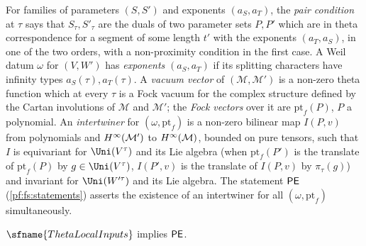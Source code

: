 \begin{definition}\label{pf:fs:pairdefs}
For families of parameters $(S,S')$ and exponents $(a_S,a_T)$, the \emph{pair condition} at $\tau$ says that $S_\tau,S'_\tau$ are the
duals of two parameter sets $P,P'$ which are in theta correspondence for a segment of some length $t'$ with the exponents
$(a_T,a_S)$, in one of the two orders, with a non-proximity condition in the first case. A Weil datum $\omega$ for $(V,W')$ has
\emph{exponents} $(a_S,a_T)$ if its splitting characters have infinity types $a_S(\tau),a_T(\tau)$. A \emph{vacuum vector} of
$(\mathcal M,\mathcal M')$ is a non-zero theta function which at every $\tau$ is a Fock vacuum for the complex structure defined by the
Cartan involutions of $\mathcal M$ and $\mathcal M'$; the \emph{Fock vectors} over it are $\mathrm{pt}_f(P)$, $P$ a polynomial. An
\emph{intertwiner} for $(\omega,\mathrm{pt}_f)$ is a non-zero bilinear map $I(P,v)$ from polynomials and $H^{\infty}(\mathcal M')$ to
$H^{\infty}(\mathcal M)$, bounded on pure tensors, such that $I$ is equivariant for $\Uni(V^\tau)$ and its Lie algebra (when
$\mathrm{pt}_f(P')$ is the translate of $\mathrm{pt}_f(P)$ by $g\in\Uni(V^\tau)$, $I(P',v)$ is the translate of $I(P,v)$ by
$\pi_\tau(g)$) and invariant for $\Uni(W'^\tau)$ and its Lie algebra. The statement $\mathsf{PE}$ (\cref{pf:fs:statements}) asserts the
existence of an intertwiner for all $(\omega,\mathrm{pt}_f)$ simultaneously.
\end{definition}

\begin{proposition}\label{pf:fs:pairex}
$\sfname{ThetaLocalInputs}$ implies $\mathsf{PE}$.
\end{proposition}

